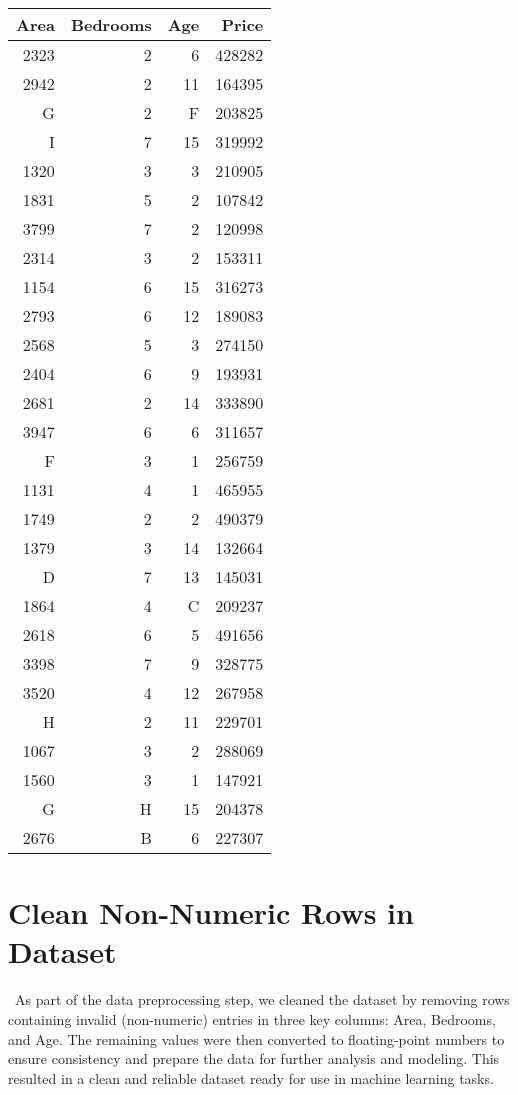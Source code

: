 \documentclass[12pt, a4paper]{report}
\begin{document}
\begin{table}[h!]
    \centering
    \begin{tabular}{|r|r|r|r|}
\hline
\textbf{Area} & \textbf{Bedrooms} & \textbf{Age} & \textbf{Price} \\
\hline
2323 & 2 & 6 & 428282 \\
2942 & 2 & 11 & 164395 \\
G & 2 & F & 203825 \\
I & 7 & 15 & 319992 \\
1320 & 3 & 3 & 210905 \\
1831 & 5 & 2 & 107842 \\
3799 & 7 & 2 & 120998 \\
2314 & 3 & 2 & 153311 \\
1154 & 6 & 15 & 316273 \\
2793 & 6 & 12 & 189083 \\
2568 & 5 & 3 & 274150 \\
2404 & 6 & 9 & 193931 \\
2681 & 2 & 14 & 333890 \\
3947 & 6 & 6 & 311657 \\
F & 3 & 1 & 256759 \\
1131 & 4 & 1 & 465955 \\
1749 & 2 & 2 & 490379 \\
1379 & 3 & 14 & 132664 \\
D & 7 & 13 & 145031 \\
1864 & 4 & C & 209237 \\
2618 & 6 & 5 & 491656 \\
3398 & 7 & 9 & 328775 \\
3520 & 4 & 12 & 267958 \\
H & 2 & 11 & 229701 \\
1067 & 3 & 2 & 288069 \\
1560 & 3 & 1 & 147921 \\
G & H & 15 & 204378 \\
2676 & B & 6 & 227307 \\
\hline
    \end{tabular}
\end{table}

\newpage\section{Clean Non-Numeric Rows in Dataset}\
As part of the data preprocessing step, we cleaned the dataset by removing rows containing invalid (non-numeric) entries in three key columns: Area, Bedrooms, and Age. The remaining values were then converted to floating-point numbers to ensure consistency and prepare the data for further analysis and modeling. This resulted in a clean and reliable dataset ready for use in machine learning tasks.
\end{document}
